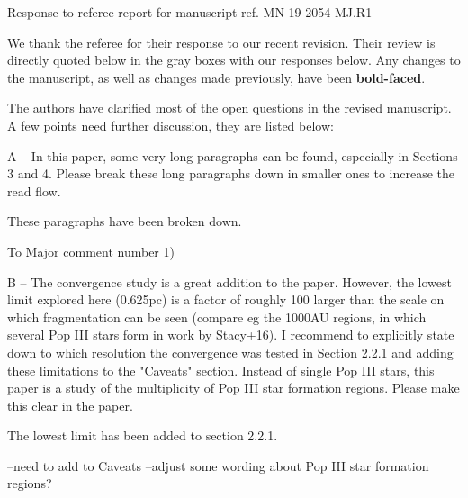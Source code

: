 \documentclass[11pt]{article}
\newenvironment{referee}[1][]{%
    \ignorespaces%
    \begin{mdframed}[style=myquotestyle,#1]%
}{%
    \end{mdframed}%
    \ignorespacesafterend%
}%
\begin{document}
\begin{center} 
\bfseries{
\begin{large}
  Response to referee report for manuscript ref. MN-19-2054-MJ.R1
\end{large}
}
\end{center}

We thank the referee for their response to our recent revision. Their review is directly quoted below in the gray boxes with our responses below.  Any changes to the manuscript, as well as changes made previously, have been \textbf{bold-faced}.

\begin{referee}
    The authors have clarified most of the open questions in the revised manuscript. A few points need further discussion, they are listed below: 
\end{referee}

\begin{referee}
    A -- In this paper, some very long paragraphs can be found, especially in Sections 3 and 4. Please break these long paragraphs down in smaller ones to increase the read flow. 
\end{referee}
    These paragraphs have been broken down. 

\begin{referee}
    To Major comment number 1) 

    B -- The convergence study is a great addition to the paper. However, the lowest limit explored here (0.625pc) is a factor of roughly 100 larger than the scale on which fragmentation can be seen (compare eg the 1000AU regions, in which several Pop III stars form in work by Stacy+16). I recommend to explicitly state down to which resolution the convergence was tested in Section 2.2.1 and adding these limitations to the "Caveats" section. Instead of single Pop III stars, this paper is a study of the multiplicity of Pop III star formation regions. Please make this clear in the paper. 
\end{referee}
    The lowest limit has been added to section 2.2.1.

    --need to add to Caveats
    --adjust some wording about Pop III star formation regions?

\end{document}
